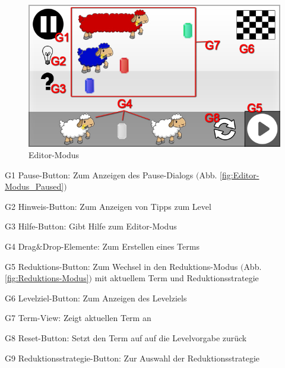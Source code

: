 
\begin{figure}[H]
\centering
\includegraphics[scale=0.55]{../gui/_jpeg_numeration/game.jpg}
\caption{Editor-Modus}
\label{fig:Editor-Modus}
\end{figure}
\begin{description*}
\item[G1] Pause-Button: Zum Anzeigen des Pause-Dialogs $($Abb. \ref{fig:Editor-Modus_Paused}$)$
\item[G2] Hinweis-Button: Zum Anzeigen von Tipps zum Level
\item[G3] Hilfe-Button: Gibt Hilfe zum Editor-Modus
\item[G4] Drag$\&$Drop-Elemente: Zum Erstellen eines Terms
\item[G5] Reduktions-Button: Zum Wechsel in den Reduktions-Modus $($Abb. \ref{fig:Reduktions-Modus}$)$ mit aktuellem Term und Reduktionsstrategie
\item[G6] Levelziel-Button: Zum Anzeigen des Levelziels
\item[G7] Term-View: Zeigt aktuellen Term an
\item[G8] Reset-Button: Setzt den Term auf auf die Levelvorgabe zurück
\item[G9] Reduktionsstrategie-Button: Zur Auswahl der Reduktionsstrategie
\end{description*}


